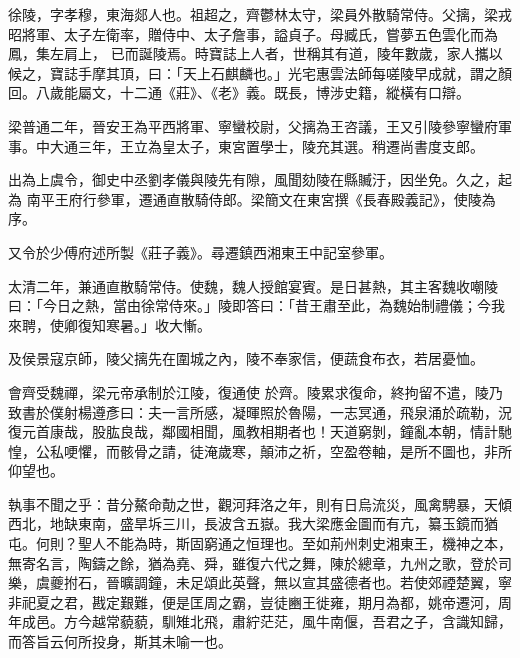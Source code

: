 
\begin{pinyinscope}

 徐陵，字孝穆，東海郯人也。祖超之，齊鬱林太守，梁員外散騎常侍。父摛，梁戎昭將軍、太子左衛率，贈侍中、太子詹事，謚貞子。母臧氏，嘗夢五色雲化而為鳳，集左肩上，
 已而誕陵焉。時寶誌上人者，世稱其有道，陵年數歲，家人攜以候之，寶誌手摩其頂，曰：「天上石麒麟也。」光宅惠雲法師每嗟陵早成就，謂之顏回。八歲能屬文，十二通《莊》、《老》義。既長，博涉史籍，縱橫有口辯。



 梁普通二年，晉安王為平西將軍、寧蠻校尉，父摛為王咨議，王又引陵參寧蠻府軍事。中大通三年，王立為皇太子，東宮置學士，陵充其選。稍遷尚書度支郎。



 出為上虞令，御史中丞劉孝儀與陵先有隙，風聞劾陵在縣贓汙，因坐免。久之，起為
 南平王府行參軍，遷通直散騎侍郎。梁簡文在東宮撰《長春殿義記》，使陵為序。



 又令於少傅府述所製《莊子義》。尋遷鎮西湘東王中記室參軍。



 太清二年，兼通直散騎常侍。使魏，魏人授館宴賓。是日甚熱，其主客魏收嘲陵曰：「今日之熱，當由徐常侍來。」陵即答曰：「昔王肅至此，為魏始制禮儀；今我來聘，使卿復知寒暑。」收大慚。



 及侯景寇京師，陵父摛先在圍城之內，陵不奉家信，便蔬食布衣，若居憂恤。



 會齊受魏禪，梁元帝承制於江陵，復通使
 於齊。陵累求復命，終拘留不遣，陵乃致書於僕射楊遵彥曰：夫一言所感，凝暉照於魯陽，一志冥通，飛泉涌於疏勒，況復元首康哉，股肱良哉，鄰國相聞，風教相期者也！天道窮剝，鐘亂本朝，情計馳惶，公私哽懼，而骸骨之請，徒淹歲寒，顛沛之祈，空盈卷軸，是所不圖也，非所仰望也。



 執事不聞之乎：昔分鰲命勣之世，觀河拜洛之年，則有日烏流災，風禽騁暴，天傾西北，地缺東南，盛旱坼三川，長波含五嶽。我大梁應金圖而有亢，纂玉鏡而猶
 屯。何則？聖人不能為時，斯固窮通之恒理也。至如荊州刺史湘東王，機神之本，無寄名言，陶鑄之餘，猶為堯、舜，雖復六代之舞，陳於總章，九州之歌，登於司樂，虞夔拊石，晉曠調鐘，未足頌此英聲，無以宣其盛德者也。若使郊禋楚翼，寧非祀夏之君，戡定艱難，便是匡周之霸，豈徒豳王徙雍，期月為都，姚帝遷河，周年成邑。方今越常藐藐，馴雉北飛，肅紵茫茫，風牛南偃，吾君之子，含識知歸，而答旨云何所投身，斯其未喻一也。




\end{pinyinscope}
